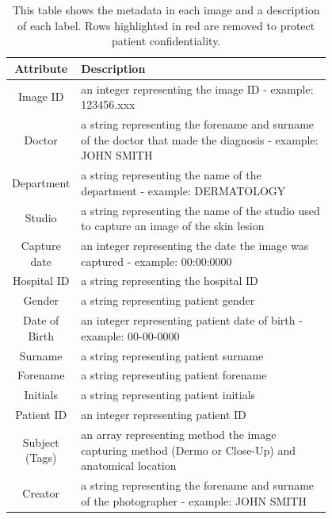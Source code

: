 \begin{table}
    \small
    \begin{tabular}{|c|p{0.8\linewidth}|}
    \hline
        Attribute & Description
        \\
        \hline
        Image ID & an integer representing the image ID - example: 123456.xxx
        \\
        \hline
        \rowcolor{Red}
        Doctor & a string representing the forename and surname of the doctor that made the diagnosis - example: JOHN SMITH
        \\
        \hline
        \rowcolor{Red}
        Department & a string representing the name of the department - example: DERMATOLOGY
        \\
        \hline
        \rowcolor{Red}
        Studio & a string representing the name of the studio used to capture an image of the skin lesion
        \\
        \hline
        Capture date & an integer representing the date the image was captured - example: 00:00:0000
        \\
        \hline
        \rowcolor{Red}
        Hospital ID & a string representing the hospital ID
        \\
        \hline
        Gender & a string representing patient gender
        \\
        \hline
        Date of Birth & an integer representing patient date of birth - example: 00-00-0000
        \\
        \hline
        \rowcolor{Red}
        Surname & a string representing patient surname
        \\
        \hline
        \rowcolor{Red}
        Forename & a string representing patient forename
        \\
        \hline
        \rowcolor{Red}
        Initials & a string representing patient initials
        \\
        \hline
        \rowcolor{Red}
        Patient ID & an integer representing patient ID
        \\
        \hline
        Subject (Tags) & an array representing method the image capturing method (Dermo or Close-Up) and anatomical location
        \\
        \hline
        \rowcolor{Red}
        Creator & a string representing the forename and surname of the photographer - example: JOHN SMITH
        \\
        \hline

    \end{tabular}
    \caption{This table shows the metadata in each image and a description of each label. Rows highlighted in red are removed to protect patient confidentiality.}
\end{table}\label{nhs-metadata}                         

